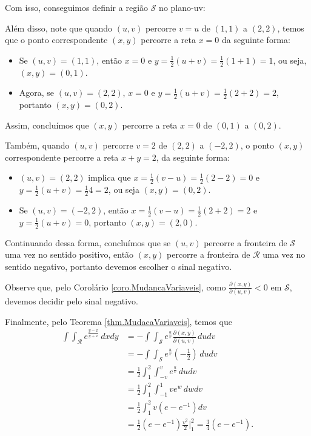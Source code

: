 \begin{example}
    Com isso, conseguimos definir a região \(\mathcal{S}\) no plano-uv: %

    Além disso, note que quando \((u,v)\) percorre \(v=u\) de \((1,1)\) a \((2,2)\), temos que o ponto correspondente \((x,y)\) percorre a reta \(x=0\) da seguinte forma:
        \begin{itemize}
            \item Se \((u,v)=(1,1)\), então \(x=0\) e \(y=\frac{1}{2}(u+v) = \frac{1}{2}(1+1) = 1\), ou seja, \((x,y) = (0,1)\).
            \item Agora, se \((u,v) = (2,2)\), \(x=0\) e \(y=\frac{1}{2}(u+v) = \frac{1}{2}(2+2)=2\), portanto \((x,y)=(0,2)\).
        \end{itemize}
    Assim, concluímos que \((x,y)\) percorre a reta \(x=0\) de \((0,1)\) a \((0,2)\).

    Também, quando \((u,v)\) percorre \(v=2\) de \((2,2)\) a \((-2,2)\), o ponto \((x,y)\) correspondente percorre a reta \(x+y=2\), da seguinte forma:
        \begin{itemize}
            \item \((u,v) = (2,2)\) implica que \(x = \frac{1}{2}(v-u) = \frac{1}{2}(2-2) = 0\) e \(y=\frac{1}{2}(u+v) = \frac{1}{2}4 = 2\), ou seja \((x,y) = (0,2)\).
            \item Se \((u,v) = (-2,2)\), então \(x = \frac{1}{2}(v-u) = \frac{1}{2}(2+2) = 2\) e \(y = \frac{1}{2}(u+v) = 0\), portanto \((x,y) = (2,0)\).
        \end{itemize}

    Continuando dessa forma, concluímos que se \((u,v)\) percorre a fronteira de \(\mathcal{S}\) uma vez no sentido positivo, então \((x,y)\) percorre a fronteira de \(\mathcal{R}\) uma vez no sentido negativo, portanto devemos escolher o sinal negativo.

    Observe que, pelo Corolário \ref{coro.MudancaVariaveis}, como \(\frac{\partial(x,y)}{\partial(u,v)}<0\) em \(\mathcal{S}\), devemos decidir pelo sinal negativo.
    
    Finalmente, pelo Teorema \ref{thm.MudacaVariaveis}, temos que
        \begin{align*}
            \int\int_\mathcal{R} e^{\frac{y-x}{y+x}} \,dxdy
                & = - \int\int_\mathcal{S} e^{\frac{u}{v}} \frac{\partial(x,y)}{\partial(u,v)}\, dudv\\
                & = - \int\int_\mathcal{S} e^{\frac{u}{v}} \left( -\frac{1}{2} \right)\, dudv \\
                & = \frac{1}{2} \int_1^2 \int_{-v}^v e^{\frac{u}{v}} \,dudv\\
                & = \frac{1}{2} \int_1^2 \int_{-1}^1 ve^w\, dwdv \\
                & = \frac{1}{2} \int_1^2 v(e - e^{-1}) dv \\
                & = \frac{1}{2} (e - e^{-1}) \frac{v^2}{2}\bigg|_1^2 = \frac{3}{4}(e - e^{-1}).
        \end{align*}


\end{example}

